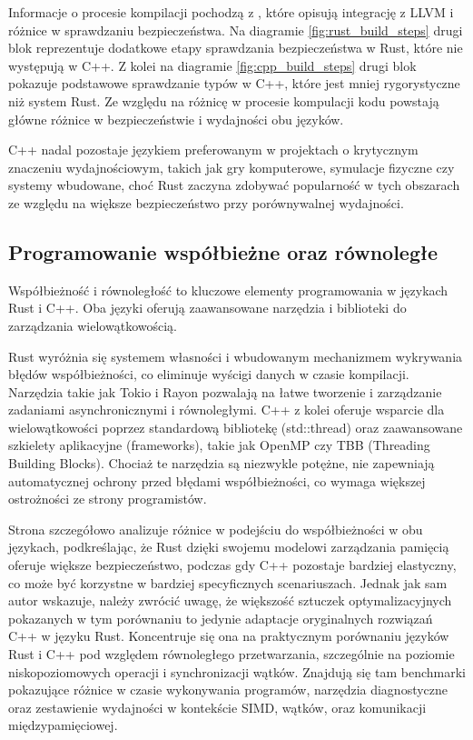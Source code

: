 Informacje o procesie kompilacji pochodzą z \cite{Lesiński, rustPolishNames, TheRustProgrammingLanguage}, które opisują integrację z LLVM i różnice w sprawdzaniu bezpieczeństwa.
Na diagramie \ref{fig:rust_build_steps} drugi blok reprezentuje dodatkowe etapy sprawdzania bezpieczeństwa w Rust, które nie występują w C++. Z kolei na diagramie \ref{fig:cpp_build_steps} drugi blok pokazuje podstawowe sprawdzanie typów w C++, które jest mniej rygorystyczne niż system Rust. Ze względu na różnicę w procesie kompulacji kodu powstają główne różnice w bezpieczeństwie i wydajności obu języków.

C++ nadal pozostaje językiem preferowanym w projektach o krytycznym znaczeniu wydajnościowym, takich jak gry komputerowe, symulacje fizyczne czy systemy wbudowane, choć Rust zaczyna zdobywać popularność w tych obszarach ze względu na większe bezpieczeństwo przy porównywalnej wydajności. 

\subsection{Programowanie współbieżne oraz równoległe}
\label{Współbieżność}
Współbieżność i równoległość to kluczowe elementy programowania w  językach Rust i C++. Oba języki oferują zaawansowane narzędzia i biblioteki do zarządzania wielowątkowością.

Rust wyróżnia się systemem własności  i wbudowanym mechanizmem wykrywania błędów współbieżności, co eliminuje wyścigi danych w czasie kompilacji. Narzędzia takie jak Tokio i Rayon pozwalają na łatwe tworzenie i zarządzanie zadaniami asynchronicznymi i równoległymi.
C++ z kolei oferuje wsparcie dla wielowątkowości poprzez standardową bibliotekę (std::thread) oraz zaawansowane szkielety aplikacyjne (frameworks), takie jak OpenMP czy TBB (Threading Building Blocks). Chociaż te narzędzia są niezwykle potężne, nie zapewniają automatycznej ochrony przed błędami współbieżności, co wymaga większej ostrożności ze strony programistów.

Strona \cite{parallelrustcppIntroductionComparing} szczegółowo analizuje różnice w podejściu do współbieżności w obu językach, podkreślając, że Rust dzięki swojemu modelowi zarządzania pamięcią oferuje większe bezpieczeństwo, podczas gdy C++ pozostaje bardziej elastyczny, co może być korzystne w bardziej specyficznych scenariuszach. Jednak jak sam autor \cite{parallelrustcppIntroductionComparing} wskazuje, należy zwrócić uwagę, że większość sztuczek optymalizacyjnych pokazanych w tym porównaniu to jedynie adaptacje oryginalnych rozwiązań C++ w języku Rust. Koncentruje się ona na praktycznym porównaniu języków Rust i C++ pod względem równoległego przetwarzania, szczególnie na poziomie niskopoziomowych operacji i synchronizacji wątków. Znajdują się tam benchmarki pokazujące różnice w czasie wykonywania programów, narzędzia diagnostyczne oraz zestawienie wydajności w kontekście SIMD, wątków, oraz komunikacji międzypamięciowej.

